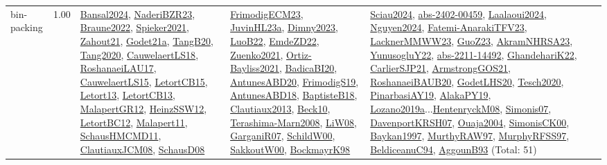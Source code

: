 {\begin{longtable}{p{3cm}r>{\raggedright\arraybackslash}p{6cm}>{\raggedright\arraybackslash}p{6cm}>{\raggedright\arraybackslash}p{8cm}}
\index{bin-packing}\index{Constraints!bin-packing}bin-packing &  1.00 & \hyperref[detail:Bansal2024]{Bansal2024}, \hyperref[detail:NaderiBZR23]{NaderiBZR23}, \hyperref[detail:Braune2022]{Braune2022}, \hyperref[detail:Spieker2021]{Spieker2021}, \hyperref[detail:Zahout21]{Zahout21}, \hyperref[detail:Godet21a]{Godet21a}, \hyperref[detail:TangB20]{TangB20}, \hyperref[detail:Tang2020]{Tang2020}, \hyperref[detail:CauwelaertLS18]{CauwelaertLS18}, \hyperref[detail:RoshanaeiLAU17]{RoshanaeiLAU17}, \hyperref[detail:CauwelaertLS15]{CauwelaertLS15}, \hyperref[detail:LetortCB15]{LetortCB15}, \hyperref[detail:Letort13]{Letort13}, \hyperref[detail:LetortCB13]{LetortCB13}, \hyperref[detail:MalapertGR12]{MalapertGR12}, \hyperref[detail:HeinzSSW12]{HeinzSSW12}, \hyperref[detail:LetortBC12]{LetortBC12}, \hyperref[detail:Malapert11]{Malapert11}, \hyperref[detail:SchausHMCMD11]{SchausHMCMD11}, \hyperref[detail:ClautiauxJCM08]{ClautiauxJCM08}, \hyperref[detail:SchausD08]{SchausD08} & \hyperref[detail:FrimodigECM23]{FrimodigECM23}, \hyperref[detail:JuvinHL23a]{JuvinHL23a}, \hyperref[detail:Dimny2023]{Dimny2023}, \hyperref[detail:LuoB22]{LuoB22}, \hyperref[detail:EmdeZD22]{EmdeZD22}, \hyperref[detail:Zuenko2021]{Zuenko2021}, \hyperref[detail:Ortiz-Bayliss2021]{Ortiz-Bayliss2021}, \hyperref[detail:BadicaBI20]{BadicaBI20}, \hyperref[detail:AntunesABD20]{AntunesABD20}, \hyperref[detail:FrimodigS19]{FrimodigS19}, \hyperref[detail:AntunesABD18]{AntunesABD18}, \hyperref[detail:BaptisteB18]{BaptisteB18}, \hyperref[detail:Clautiaux2013]{Clautiaux2013}, \hyperref[detail:Beck10]{Beck10}, \hyperref[detail:Terashima-Marn2008]{Terashima-Marn2008}, \hyperref[detail:LiW08]{LiW08}, \hyperref[detail:GarganiR07]{GarganiR07}, \hyperref[detail:SchildW00]{SchildW00}, \hyperref[detail:SakkoutW00]{SakkoutW00}, \hyperref[detail:BockmayrK98]{BockmayrK98} & \hyperref[detail:Sciau2024]{Sciau2024}, \hyperref[detail:abs-2402-00459]{abs-2402-00459}, \hyperref[detail:Laalaoui2024]{Laalaoui2024}, \hyperref[detail:Nguyen2024]{Nguyen2024}, \hyperref[detail:Fatemi-AnarakiTFV23]{Fatemi-AnarakiTFV23}, \hyperref[detail:LacknerMMWW23]{LacknerMMWW23}, \hyperref[detail:GuoZ23]{GuoZ23}, \hyperref[detail:AkramNHRSA23]{AkramNHRSA23}, \hyperref[detail:YunusogluY22]{YunusogluY22}, \hyperref[detail:abs-2211-14492]{abs-2211-14492}, \hyperref[detail:GhandehariK22]{GhandehariK22}, \hyperref[detail:CarlierSJP21]{CarlierSJP21}, \hyperref[detail:ArmstrongGOS21]{ArmstrongGOS21}, \hyperref[detail:RoshanaeiBAUB20]{RoshanaeiBAUB20}, \hyperref[detail:GodetLHS20]{GodetLHS20}, \hyperref[detail:Tesch2020]{Tesch2020}, \hyperref[detail:PinarbasiAY19]{PinarbasiAY19}, \hyperref[detail:AlakaPY19]{AlakaPY19}, \hyperref[detail:Lozano2019a]{Lozano2019a}...\hyperref[detail:HentenryckM08]{HentenryckM08}, \hyperref[detail:Simonis07]{Simonis07}, \hyperref[detail:DavenportKRSH07]{DavenportKRSH07}, \hyperref[detail:Ouaja2004]{Ouaja2004}, \hyperref[detail:SimonisCK00]{SimonisCK00}, \hyperref[detail:Baykan1997]{Baykan1997}, \hyperref[detail:MurthyRAW97]{MurthyRAW97}, \hyperref[detail:MurphyRFSS97]{MurphyRFSS97}, \hyperref[detail:BeldiceanuC94]{BeldiceanuC94}, \hyperref[detail:AggounB93]{AggounB93} (Total: 51)\\

\end{longtable}}
